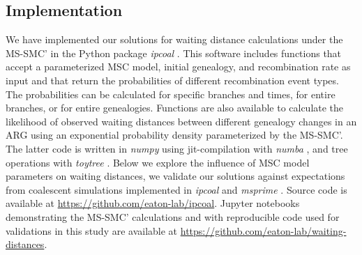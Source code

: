 \documentclass[11pt]{article}
\begin{document}
\subsection{Implementation}
We have implemented our solutions for waiting distance calculations
under the MS-SMC' in the Python package \emph{ipcoal} \citep{mckenzie_ipcoal_2020}.
This software includes functions that accept a parameterized MSC model, initial genealogy, 
and recombination rate as input and that return the probabilities of different 
recombination event types. The probabilities can be calculated for specific 
branches and times, for entire branches, or for entire genealogies. 
Functions are also available to calculate the likelihood of observed 
waiting distances between different genealogy changes in an ARG 
using an exponential probability density parameterized by the MS-SMC'.
The latter code is written in \emph{numpy} \citep{harris2020array} using 
jit-compilation with \emph{numba} \citep{lam2015numba}, and tree operations
with \emph{toytree} \citep{eaton_toytree_2020}.
Below we explore the influence of MSC model parameters on waiting distances, 
we validate our solutions against expectations from coalescent simulations 
implemented in \emph{ipcoal} and \emph{msprime} \citep{baumdicker_efficient_2022}.
Source code is available at \url{https://github.com/eaton-lab/ipcoal}.
Jupyter notebooks demonstrating the MS-SMC' calculations and with 
reproducible code used for validations in this study are available
at \url{https://github.com/eaton-lab/waiting-distances}.

\end{document}

